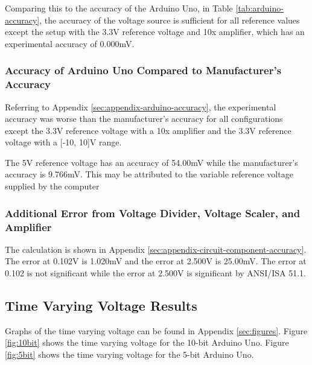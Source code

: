 Comparing this to the accuracy of the Arduino Uno, in Table \ref{tab:arduino-accuracy}, the accuracy of 
the voltage source is sufficient for all reference values except the setup with the 3.3V reference voltage and 10x amplifier, which has an experimental accuracy of 0.000mV.


\subsubsection{Accuracy of Arduino Uno Compared to Manufacturer's Accuracy}
\noindent Referring to Appendix \ref{sec:appendix-arduino-accuracy}, the experimental accuracy was worse than the manufacturer's accuracy for all configurations 
except the 3.3V reference voltage with a 10x amplifier and the 3.3V reference voltage with a [-10, 10]V range.

The 5V reference voltage has an accuracy of 54.00mV while the manufacturer's accuracy is 9.766mV. This may be attributed to the variable reference voltage supplied by the computer


\subsubsection{Additional Error from Voltage Divider, Voltage Scaler, and Amplifier}

\noindent The calculation is shown in Appendix \ref{sec:appendix-circuit-component-accuracy}. The error at 0.102V is 1.020mV and the error at 2.500V is 25.00mV. The error at 0.102 
is not significant while the error at 2.500V is significant by ANSI/ISA 51.1.

\subsection{Time Varying Voltage Results}
Graphs of the time varying voltage can be found in Appendix \ref{sec:figures}. Figure \ref{fig:10bit} shows the time varying voltage for the 10-bit Arduino Uno. 
Figure \ref{fig:5bit} shows the time varying voltage for the 5-bit Arduino Uno. 

